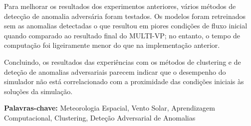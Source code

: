 Para melhorar os resultados dos experimentos anteriores, vários métodos de detecção de anomalia adversária foram testados. Os modelos foram retreinados sem as anomalias detectadas o que resultou em piores condições de fluxo inicial quando
comparado ao resultado final do MULTI-VP; no entanto, o tempo de computação foi ligeiramente menor do que na implementação anterior.

Concluindo, os resultados das experiências com os métodos de clustering e de deteção de anomalias adversariais parecem indicar que o desempenho do simulador não está correlacionado com a proximidade das condições iniciais às soluções da simulação.




\vspace{1cm}
\textbf{Palavras-chave:} Meteorologia Espacial, Vento Solar, Aprendizagem Computacional, Clustering, Deteção Adversarial de Anomalias



